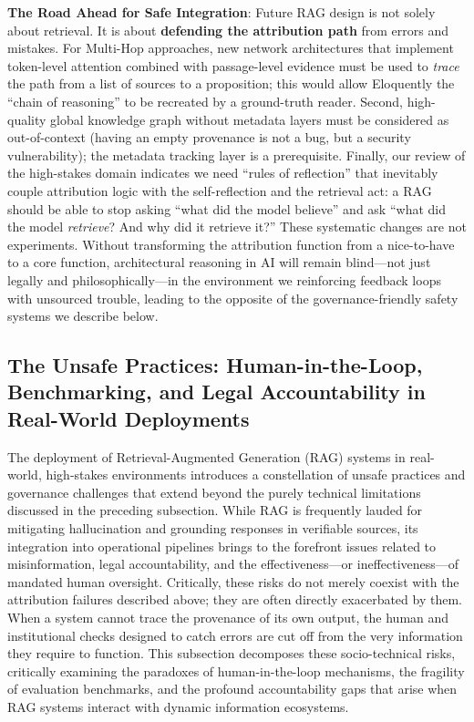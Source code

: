 \documentclass[11pt]{article}
\begin{document}
\textbf{The Road Ahead for Safe Integration}: Future RAG design is not solely about retrieval. It is about \textbf{defending the attribution path} from errors and mistakes. For Multi-Hop approaches, new network architectures that implement token-level attention combined with passage-level evidence must be used to \emph{trace} the path from a list of sources to a proposition; this would allow Eloquently the ``chain of reasoning'' to be recreated by a ground-truth reader. Second, high-quality global knowledge graph without metadata layers must be considered as out-of-context (having an empty provenance is not a bug, but a security vulnerability); the metadata tracking layer is a prerequisite. Finally, our review of the high-stakes domain indicates we need ``rules of reflection'' that inevitably couple attribution logic with the self-reflection and the retrieval act: a RAG should be able to stop asking ``what did the model believe'' and ask ``what did the model \emph{retrieve}? And why did it retrieve it?'' These systematic changes are not experiments. Without transforming the attribution function from a nice-to-have to a core function, architectural reasoning in AI will remain blind---not just legally and philosophically---in the environment we reinforcing feedback loops with unsourced trouble, leading to the opposite of the governance-friendly safety systems we describe below.

\subsection{The Unsafe Practices: Human-in-the-Loop, Benchmarking, and Legal Accountability in Real-World Deployments}

The deployment of Retrieval-Augmented Generation (RAG) systems in real-world, high-stakes environments introduces a constellation of unsafe practices and governance challenges that extend beyond the purely technical limitations discussed in the preceding subsection. While RAG is frequently lauded for mitigating hallucination and grounding responses in verifiable sources, its integration into operational pipelines brings to the forefront issues related to misinformation, legal accountability, and the effectiveness---or ineffectiveness---of mandated human oversight. Critically, these risks do not merely coexist with the attribution failures described above; they are often directly exacerbated by them. When a system cannot trace the provenance of its own output, the human and institutional checks designed to catch errors are cut off from the very information they require to function. This subsection decomposes these socio-technical risks, critically examining the paradoxes of human-in-the-loop mechanisms, the fragility of evaluation benchmarks, and the profound accountability gaps that arise when RAG systems interact with dynamic information ecosystems.
\end{document}
